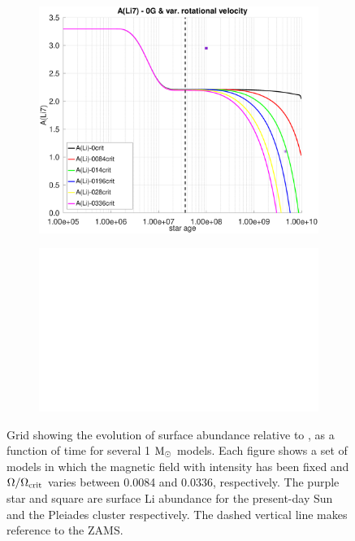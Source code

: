 \documentclass[fleqn,usenatbib]{mnras}
\begin{document}
\begin{figure}
\begin{subfigure}[h]{0.47\textwidth}
    \includegraphics[trim = 25mm 10mm 15mm 10mm, clip,width=\textwidth]{figures/paper1/li_var_vel_0_0g.eps}
    \label{fig:subim13}
    \end{subfigure}
    \begin{subfigure}[h]{0.47\textwidth}
    \includegraphics[width=\textwidth]{figures/blank.eps}
    \label{fig:subim14}
    \end{subfigure}

\caption{Grid showing the evolution of surface  abundance relative to , as a function of time for several 1 $\mathrm{M}_\odot$ models. Each figure shows a set of models in which the magnetic field with intensity has been fixed and $\Omega / \Omega_{\mathrm{crit}}$ varies between 0.0084 and 0.0336, respectively. The purple star and square are surface Li abundance for the present-day Sun \citep{Asplund2009} and the Pleiades cluster \citep{Sestito2005} respectively. The dashed vertical line makes reference to the ZAMS.}
\label{fig:grid_li_var_vel}
\end{figure}
\par
\end{document}
